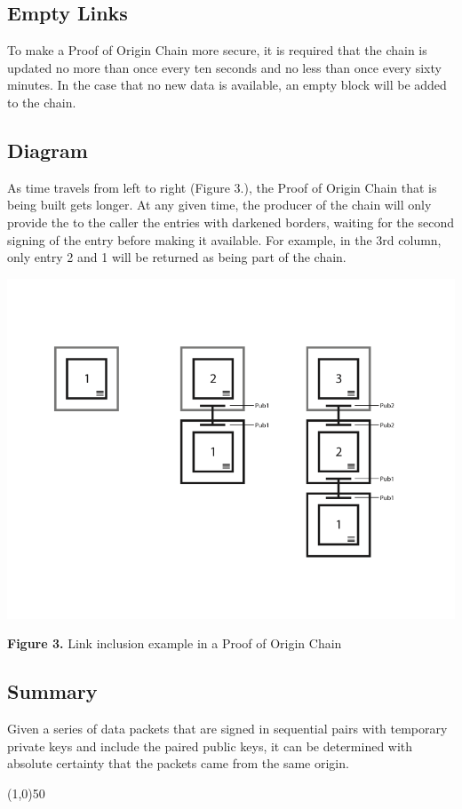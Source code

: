 \documentclass{article}
\begin{document}
\subsection {Empty Links}
To make a Proof of Origin Chain more secure, it is required that the chain is updated no more than once every ten seconds and no less than once every sixty minutes. In the case that no new data is available, an empty block will be added to the chain.

\subsection {Diagram}
As time travels from left to right (Figure 3.), the Proof of Origin Chain that is being built gets longer. At any given time, the producer of the chain will only provide the to the caller the entries with darkened borders, waiting for the second signing of the entry before making it available. For example, in the 3rd column, only entry 2 and 1 will be returned as being part of the chain.

\includegraphics[width=\textwidth] {proofoforigin}
\begin{center}\textbf{Figure 3.}  Link inclusion example in a Proof of Origin Chain
\end{center}

\subsection {Summary}
Given a series of data packets that are signed in sequential pairs with temporary private keys and include the paired public keys, it can be determined with absolute \gls{certainty} that the packets came from the same origin.
\begin{center}
\line(1,0){50}
\end{center}
\end{document}
